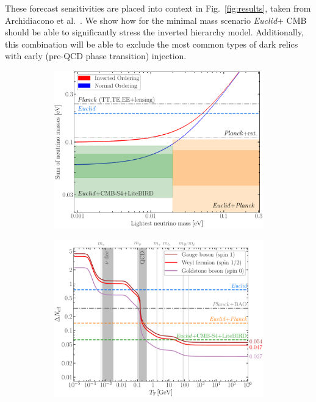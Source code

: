 \documentclass[a4paper,11pt]{article}
\newcommand{\euclid}{\textit{Euclid}\xspace}
\begin{document}
These forecast sensitivities are placed into  context in Fig.~\ref{fig:results}, taken from Archidiacono et al.~\cite{EP-Archidiacono}. We show how for the minimal mass scenario \euclid + CMB should be able to significantly stress the inverted hierarchy model. Additionally, this combination will be able to exclude the most common types of dark relics with early (pre-QCD phase transition) injection.

\begin{figure}[!htbp]
    \centering
    \begin{subfigure}{0.49\textwidth}
        \centering
        \includegraphics[width=\linewidth]{figure_hierarchy-1.pdf}
    \end{subfigure}
    \hfill
    \begin{subfigure}{0.49\textwidth}
        \centering
        \includegraphics[width=\linewidth]{figure_Neff-1.pdf}

\end{subfigure}
\end{figure}
\end{document}
